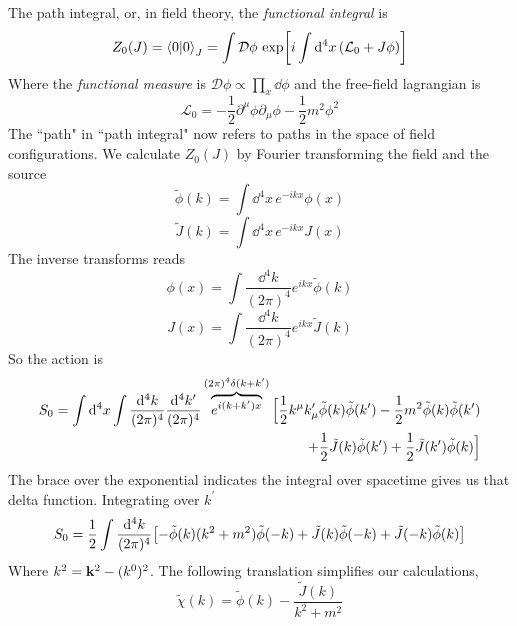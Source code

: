 The path integral, or, in field theory, the \textit{functional integral} is 
\begin{equation}
    Z_0(J)=\braket{0}_J=\int\mathcal{D}\phi\,\exp[i\int\dd^4x\,(\mathcal{L}_0+J\phi)]
\end{equation}
Where the \textit{functional measure} is $\mathcal{D}\phi\propto\prod_{x}\dd\phi$ and the free-field lagrangian is
\begin{equation}
    \mathcal{L}_0=-\frac{1}{2}\partial^\mu\phi\partial_\mu\phi-\frac{1}{2}m^2\phi^2
\end{equation}
The ``path" in ``path integral" now refers to paths in the space of field configurations.
We calculate $Z_0(J)$ by Fourier transforming the field and the source
\begin{equation}
    \tilde{\phi}(k)=\int\dd^4x\,e^{-ikx}\phi(x)
\end{equation}
\begin{equation}
    \tilde{J}(k)=\int\dd^4x\,e^{-ikx}J(x)
\end{equation}
The inverse transforms reads
\begin{equation}
    \phi(x)=\int\frac{\dd^4k}{(2\pi)^4}e^{ikx}\tilde{\phi}(k)
\end{equation}
\begin{equation}
    J(x)=\int\frac{\dd^4k}{(2\pi)^4}e^{ikx}\tilde{J}(k)
\end{equation}
So the action is
\begin{equation}
\begin{aligned}
        S_0=\int\dd^4x\int\frac{\dd^4k}{(2\pi)^4}\frac{\dd^4k^\prime}{(2\pi)^4}\overbrace{ e^{i(k+k^\prime)x}}^{(2\pi)^4\delta(k+k^\prime)}\Big{[}\frac{1}{2}k^{\mu}k_\mu^\prime \tilde{\phi}(k)\tilde{\phi}(k^\prime)-\frac{1}{2}m^2\tilde{\phi}(k)\tilde{\phi}(k^\prime)\\
        +\frac{1}{2}\tilde{J}(k)\tilde{\phi}(k^\prime)+\frac{1}{2}\tilde{J}(k^\prime)\tilde{\phi}(k)\Big{]}
\end{aligned}
\end{equation}
The brace over the exponential indicates the integral over spacetime gives us that delta function. Integrating over $k^\prime$ 
\begin{equation}
    S_0=\frac{1}{2}\int\frac{\dd^4k}{(2\pi)^4}\qty[-\tilde{\phi}(k)(k^2+m^2)\tilde{\phi}(-k)+\tilde{J}(k)\tilde{\phi}(-k)+\tilde{J}(-k)\tilde{\phi}(k)]
\end{equation}
Where $k^2=\vb{k}^2-(k^0)^2$. The following translation simplifies our calculations,
\begin{equation}
    \tilde{\chi}(k)=\tilde{\phi}(k)-\frac{\tilde{J}(k)}{k^2+m^2}
\end{equation}
